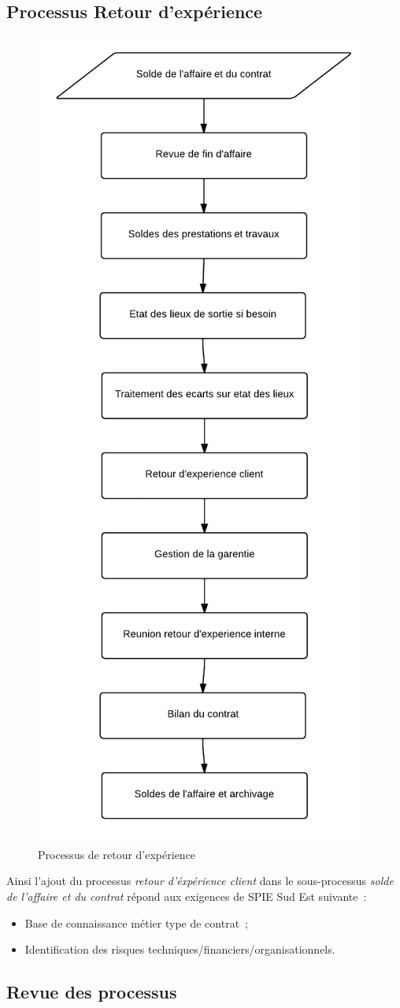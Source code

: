 \subsection{Processus Retour d'expérience}

\begin{figure}[h!]
	\centering
	\includegraphics[width=0.45\linewidth]{images/processus_retour_experience.png}
	\caption{Processus de retour d’expérience}
	\label{fig:processusRetourExperience}
\end{figure}

Ainsi l'ajout du processus \textit{retour d'\'exp\'erience client} dans le sous-processus \textit{solde
de l'affaire et du contrat} r\'epond aux exigences de SPIE Sud Est suivante~:

\begin{itemize}
    \item Base de connaissance m\'etier type de contrat~;
    \item Identification des risques techniques/financiers/organisationnels.
\end{itemize}


\subsection{Revue des processus}

